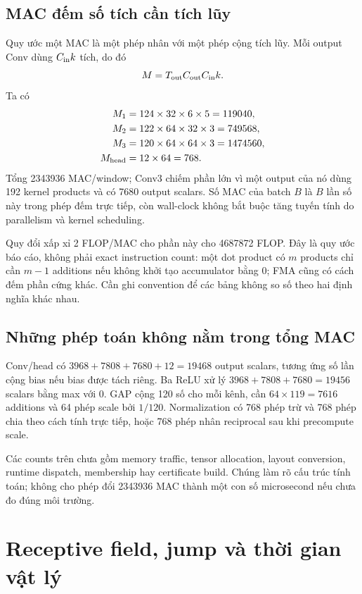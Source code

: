 \documentclass[11pt,a4paper]{article}
\theoremstyle{definition}
\begin{document}
\subsection{MAC đếm số tích cần tích lũy}
Quy ước một MAC là một phép nhân với một phép cộng tích lũy. Mỗi output
Conv dùng $C_{\rm in}k$ tích, do đó
\begin{equation}
M=T_{\rm out}C_{\rm out}C_{\rm in}k.
\end{equation}
Ta có
\begin{align}
M_1&=124\times32\times6\times5=119040,\\
M_2&=122\times64\times32\times3=749568,\\
M_3&=120\times64\times64\times3=1474560,\\
M_{\rm head}&=12\times64=768.
\end{align}
Tổng 2343936 MAC/window; Conv3 chiếm phần lớn vì một output của nó dùng
192 kernel products và có 7680 output scalars. Số MAC của batch $B$ là
$B$ lần số này trong phép đếm trực tiếp, còn wall-clock không bắt buộc
tăng tuyến tính do parallelism và kernel scheduling.

Quy đổi xấp xỉ 2 FLOP/MAC cho phần này cho 4687872 FLOP. Đây là quy ước
báo cáo, không phải exact instruction count: một dot product có $m$
products chỉ cần $m-1$ additions nếu không khởi tạo accumulator bằng 0;
FMA cũng có cách đếm phần cứng khác. Cần ghi convention để các bảng
không so số theo hai định nghĩa khác nhau.

\subsection{Những phép toán không nằm trong tổng MAC}
Conv/head có $3968+7808+7680+12=19468$ output scalars, tương ứng số lần
cộng bias nếu bias được tách riêng. Ba ReLU xử lý
$3968+7808+7680=19456$ scalars bằng max với 0. GAP cộng 120 số cho mỗi
kênh, cần $64\times119=7616$ additions và 64 phép scale bởi $1/120$.
Normalization có 768 phép trừ và 768 phép chia theo cách tính trực tiếp,
hoặc 768 phép nhân reciprocal sau khi precompute scale.

Các counts trên chưa gồm memory traffic, tensor allocation, layout
conversion, runtime dispatch, membership hay certificate build. Chúng
làm rõ cấu trúc tính toán; không cho phép đổi 2343936 MAC thành một con
số microsecond nếu chưa đo đúng môi trường.

\section{Receptive field, jump và thời gian vật lý}
\end{document}
